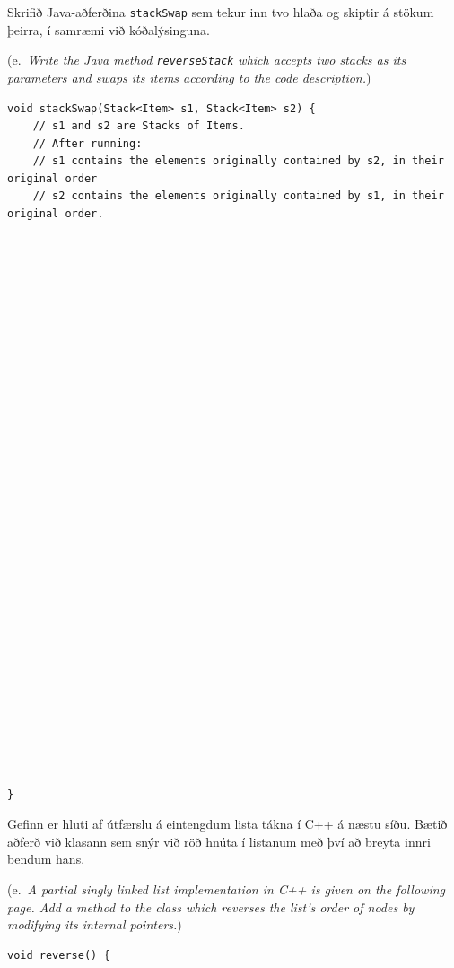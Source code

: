 \documentclass[addpoints]{exam}
\newcommand{\eng}[1]{(e.\ \emph{#1})}
\begin{document}
\begin{questions}
\question[4] Skrifið Java-aðferðina \texttt{stackSwap} sem tekur inn tvo hlaða og skiptir á stökum þeirra, í samræmi við kóðalýsinguna.

\eng{Write the Java method \texttt{reverseStack} which accepts two stacks as its parameters and swaps its items according to the code description.}

\begin{verbatim}
void stackSwap(Stack<Item> s1, Stack<Item> s2) {
    // s1 and s2 are Stacks of Items.
    // After running:
    // s1 contains the elements originally contained by s2, in their original order
    // s2 contains the elements originally contained by s1, in their original order.
































}
\end{verbatim}
\newpage
\question[4] Gefinn er hluti af útfærslu á eintengdum lista tákna í C++ á næstu síðu. Bætið aðferð við klasann sem snýr við röð hnúta í listanum með því að breyta innri bendum hans.

\eng{A partial singly linked list implementation in C++ is given on the following page. Add a method to the class which reverses the list's order of nodes by modifying its internal pointers.}

\begin{verbatim}
void reverse() {
	 
	 
	 
	 

	 
	 
	 
	 
    
	 
	 
	 
	 
	 
	 
	 
	 
	 
	 
	 
	 
	 
	 
	 
	 
	 

\end{verbatim}
\end{questions}
\end{document}
